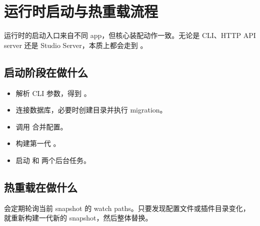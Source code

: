 \documentclass[11pt,a4paper]{ctexart}
\begin{document}
\section{运行时启动与热重载流程}

运行时的启动入口来自不同 app，但核心装配动作一致。无论是 CLI、HTTP API server 还是 Studio Server，本质上都会走到 。

\subsection{启动阶段在做什么}

\begin{itemize}
  \item 解析 CLI 参数，得到 。
  \item 连接数据库，必要时创建目录并执行 migration。
  \item 调用  合并配置。
  \item 构建第一代 。
  \item 启动  和  两个后台任务。
\end{itemize}

\subsection{热重载在做什么}

 会定期轮询当前 snapshot 的 watch paths。只要发现配置文件或插件目录变化，就重新构建一代新的 snapshot，然后整体替换。
\end{document}
